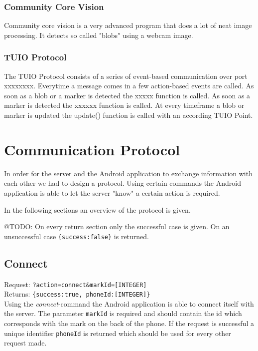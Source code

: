 \documentclass[a4paper,10pt]{article}
\begin{document}
		\subsubsection{Community Core Vision}
		\label{sec:communitycorevision}	
		Community core vision is a very advanced program that does a lot of neat image processing. 
		It detects so called "blobs" using a webcam image. 

		\subsubsection{TUIO Protocol}
		\label{sec:tuioprotocol}
		The TUIO Protocol consists of a series of event-based communication over port xxxxxxxx. 
		Everytime a message comes in a few action-based events are called.  
		As soon as a blob or a marker is detected the xxxxx function is called. 
		As soon as a marker is detected the xxxxxx function is called. 
		At every timeframe a blob or marker is updated the update() function is called with an according TUIO Point.
		
\section{Communication Protocol}
\label{sec:communication-protocol}
In order for the server and the Android application to exchange information with each other we had to design a protocol.
Using certain commands the Android application is able to let the server "know" a certain action is required.

In the following sections an overview of the protocol is given.

@TODO: On every return section only the successful case is given. On an unsuccessful case \texttt{\{success:false\}} is returned.

\subsection{Connect}
Request: \texttt{?action=connect\&markId=[INTEGER]} \\
Returns: \texttt{\{success:true, phoneId:[INTEGER]\}} \\

\noindent Using the \emph{connect}-command the Android application is able to connect itself with the server.
The parameter \texttt{markId} is required and should contain the id which corresponds with the mark on the back of the phone.
If the request is successful a unique identifier \texttt{phoneId} is returned which should be used for every other request made.
\end{document}
